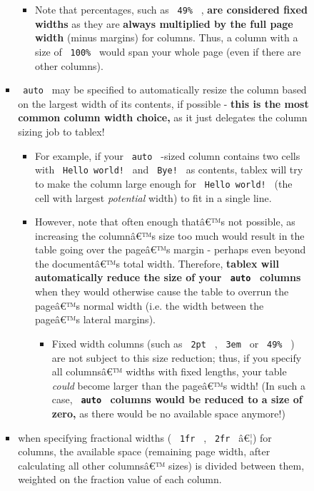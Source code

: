\begin{enumerate}
\begin{itemize}
\begin{itemize}
\begin{itemize}
        \begin{itemize}
        \tightlist
        \item
          Note that percentages, such as \texttt{\ 49\%\ } , \textbf{are
          considered fixed widths} as they are \textbf{always multiplied
          by the full page width} (minus margins) for columns. Thus, a
          column with a size of \texttt{\ 100\%\ } would span your whole
          page (even if there are other columns).
        \end{itemize}
      \item
        \texttt{\ auto\ } may be specified to automatically resize the
        column based on the largest width of its contents, if possible -
        \textbf{this is the most common column width choice,} as it just
        delegates the column sizing job to tablex!

        \begin{itemize}
        \tightlist
        \item
          For example, if your \texttt{\ auto\ } -sized column contains
          two cells with \texttt{\ Hello\ world!\ } and
          \texttt{\ Bye!\ } as contents, tablex will try to make the
          column large enough for \texttt{\ Hello\ world!\ } (the cell
          with largest \emph{potential} width) to fit in a single line.
        \item
          However, note that often enough thatâ€™s not possible, as
          increasing the columnâ€™s size too much would result in the
          table going over the pageâ€™s margin - perhaps even beyond the
          documentâ€™s total width. Therefore, \textbf{tablex will
          automatically reduce the size of your \texttt{\ auto\ }
          columns} when they would otherwise cause the table to overrun
          the pageâ€™s normal width (i.e. the width between the pageâ€™s
          lateral margins).

          \begin{itemize}
          \tightlist
          \item
            Fixed width columns (such as \texttt{\ 2pt\ } ,
            \texttt{\ 3em\ } or \texttt{\ 49\%\ } ) are not subject to
            this size reduction; thus, if you specify all columnsâ€™
            widths with fixed lengths, your table \emph{could} become
            larger than the pageâ€™s width! (In such a case,
            \textbf{\texttt{\ auto\ } columns would be reduced to a size
            of zero,} as there would be no available space anymore!)
          \end{itemize}
        \end{itemize}
      \item
        when specifying fractional widths ( \texttt{\ 1fr\ } ,
        \texttt{\ 2fr\ } â€¦) for columns, the available space
        (remaining page width, after calculating all other columnsâ€™
        sizes) is divided between them, weighted on the fraction value
        of each column.


\end{itemize}
\end{itemize}
\end{itemize}
\end{enumerate}
